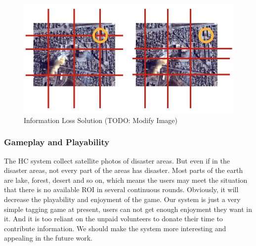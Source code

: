 \begin{figure}[htp]
\centering
\includegraphics[width=0.5\columnwidth]{figures/information_loss}
\caption{Information Loss Solution (TODO: Modify Image)}
\label{fig:information_loss}
\end{figure}

\subsubsection{Gameplay and Playability}
The HC system collect satellite photos of disaster areas. But even if in the disaster areas, 
not every part of the areas has disaster. Most parts of the earth are lake, forest, 
desert and so on, which means the users may meet the situation that there is no available 
ROI in several continuous rounds. Obviously, it will decrease the playability and enjoyment of the game.
Our system is just a very simple tagging game at present, users can not get enough enjoyment they want in it. 
And it is too reliant on the unpaid volunteers to donate their time to contribute information. 
We should make the system more interesting and appealing in the future work.
